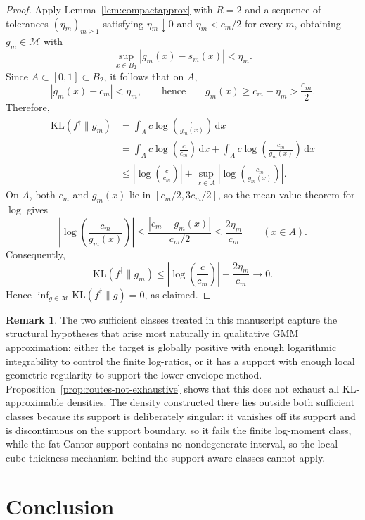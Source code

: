 \documentclass[11pt]{article}
\theoremstyle{definition}
\newtheorem{remark}[theorem]{Remark}
\begin{document}
\begin{proof}
Apply Lemma~\ref{lem:compactapprox} with $R=2$ and a sequence of tolerances $(\eta_m)_{m\ge1}$ satisfying $\eta_m\downarrow0$ and $\eta_m<c_m/2$ for every $m$, obtaining $g_m\in\mathcal M$ with
\[
\sup_{x\in B_2} |g_m(x)-s_m(x)|<\eta_m.
\]
Since $A\subset[0,1]\subset B_2$, it follows that on $A$,
\[
|g_m(x)-c_m|<\eta_m,
\qquad
\text{hence}
\qquad
g_m(x)\ge c_m-\eta_m>\frac{c_m}{2}.
\]
Therefore,
\begin{align*}
\mathrm{KL}(f^{\dagger}\|g_m)
&=\int_A c\log\!\left(\frac{c}{g_m(x)}\right)\,\mathrm{d}x\\
&=\int_A c\log\!\left(\frac{c}{c_m}\right)\,\mathrm{d}x+\int_A c\log\!\left(\frac{c_m}{g_m(x)}\right)\,\mathrm{d}x\\
&\le \left|\log\!\left(\frac{c}{c_m}\right)\right|+\sup_{x\in A}\left|\log\!\left(\frac{c_m}{g_m(x)}\right)\right|.
\end{align*}
On $A$, both $c_m$ and $g_m(x)$ lie in $[c_m/2,3c_m/2]$, so the mean value theorem for $\log$ gives
\[
\left|\log\!\left(\frac{c_m}{g_m(x)}\right)\right|
\le \frac{|c_m-g_m(x)|}{c_m/2}
\le \frac{2\eta_m}{c_m}
\qquad (x\in A).
\]
Consequently,
\[
\mathrm{KL}(f^{\dagger}\|g_m)
\le \left|\log\!\left(\frac{c}{c_m}\right)\right|+\frac{2\eta_m}{c_m}\to0.
\]
Hence $\inf_{g\in\mathcal M}\mathrm{KL}(f^{\dagger}\|g)=0$, as claimed.
\end{proof}


\begin{remark}
The two sufficient classes treated in this manuscript capture the structural hypotheses that arise most naturally in qualitative GMM approximation: either the target is globally positive with enough logarithmic integrability to control the finite log-ratios, or it has a support with enough local geometric regularity to support the lower-envelope method. Proposition~\ref{prop:routes-not-exhaustive} shows that this does not exhaust all KL-approximable densities. The density constructed there lies outside both sufficient classes because its support is deliberately singular: it vanishes off its support and is discontinuous on the support boundary, so it fails the finite log-moment class, while the fat Cantor support contains no nondegenerate interval, so the local cube-thickness mechanism behind the support-aware classes cannot apply.
\end{remark}

\section{Conclusion}\label{sec:conclusion}
\end{document}
